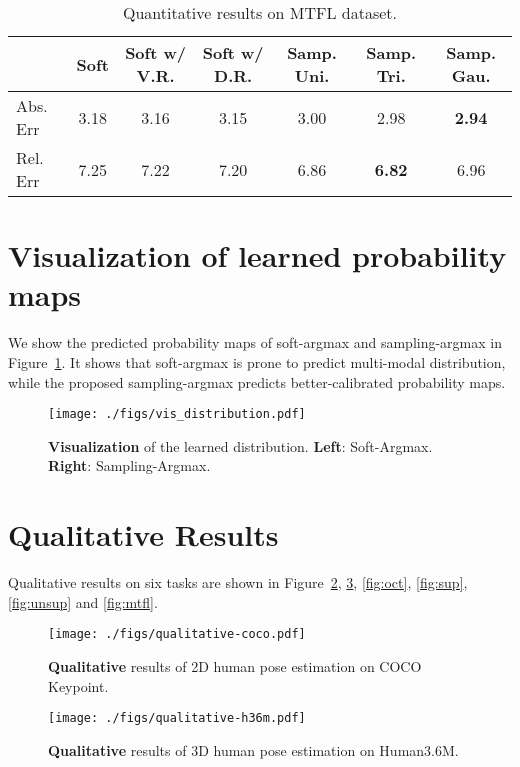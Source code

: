 \documentclass{article}
\begin{document}
\begin{table}[ht]
    \caption{Quantitative results on MTFL dataset.}
    \label{tab:mtfl}
    \centering
    \begin{tabular}{lcccccc}
        \toprule
        ~ & Soft & Soft w/ V.R. & Soft w/ D.R. & Samp. Uni. & Samp. Tri. & Samp. Gau. \\
        \midrule
        Abs. Err~ & 3.18 & 3.16 & 3.15 & 3.00 & {2.98} & \textbf{2.94} \\
        Rel. Err~ & 7.25 & 7.22 & 7.20 & 6.86 & \textbf{6.82} & 6.96 \\
        \bottomrule
    \end{tabular}
\end{table} 
\section{Visualization of learned probability maps}
\label{sec:vis}

We show the predicted probability maps of soft-argmax and sampling-argmax in Figure~\ref{fig:vis_distribution}. It shows that soft-argmax is prone to predict multi-modal distribution, while the proposed sampling-argmax predicts better-calibrated probability maps.

\begin{figure}[h]
    \centering
    \texttt{[image: ./figs/vis\_distribution.pdf]}
    \caption{\textbf{Visualization} of the learned distribution. \textbf{Left}: Soft-Argmax. \textbf{Right}: Sampling-Argmax.}
    \label{fig:vis_distribution}
\end{figure}
 
\section{Qualitative Results}
\label{sec:qualitative}

Qualitative results on six tasks are shown in Figure~\ref{fig:coco}, \ref{fig:h36m}, \ref{fig:oct}, \ref{fig:sup}, \ref{fig:unsup} and \ref{fig:mtfl}.


\begin{figure}[h]
    \centering
    \texttt{[image: ./figs/qualitative-coco.pdf]}
    \caption{\textbf{Qualitative} results of 2D human pose estimation on COCO Keypoint.}
    \label{fig:coco}
\end{figure}

\begin{figure}[h]
    \centering
    \texttt{[image: ./figs/qualitative-h36m.pdf]}
    \caption{\textbf{Qualitative} results of 3D human pose estimation on Human3.6M.}
    \label{fig:h36m}
\end{figure}
\end{document}
